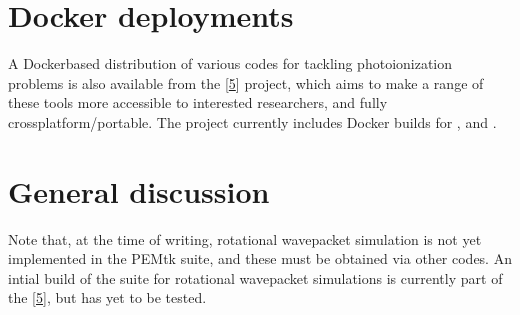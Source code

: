\documentclass[letterpaper,table,10pt,english]{jupyterBook}
\begin{document}
\section{Docker deployments}
\label{\detokenize{part1/platform_intro_071122:docker-deployments}}\label{\detokenize{part1/platform_intro_071122:sect-platform-docker}}
\sphinxAtStartPar
A Docker\sphinxhyphen{}based distribution of various codes for tackling
photoionization problems is also available from the  {[}\hyperlink{cite.backmatter/bibliography:id577}{5}{]}
project, which aims to make a range of these tools more accessible to
interested researchers, and fully cross\sphinxhyphen{}platform/portable. The project currently includes Docker builds for ,  and .


\section{General discussion}
\label{\detokenize{part1/platform_intro_071122:general-discussion}}\label{\detokenize{part1/platform_intro_071122:sect-platform-general}}
\sphinxAtStartPar
Note that, at the time of writing, rotational wavepacket simulation is
not yet implemented in the PEMtk suite, and these must be obtained via
other codes. An intial build of the  suite for rotational wavepacket simulations is currently part of the  {[}\hyperlink{cite.backmatter/bibliography:id577}{5}{]}, but has yet to be tested.

\sphinxstepscope
\end{document}

